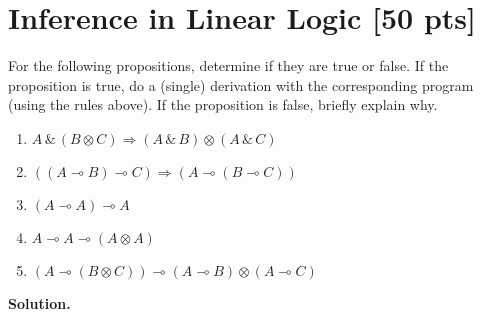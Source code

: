\documentclass{article}
\newcommand{\with}{\,\&\,}
\newcommand{\tensor}{\otimes}
\newcommand{\lolli}{\multimap}
\newenvironment{solution}{\textbf{Solution.}}{}
\begin{document}
\section{Inference in Linear Logic [50 pts]}
For the following propositions, determine if they are true or false.
If the proposition is true, do a (single) derivation with the corresponding program
(using the rules above).
If the proposition is false, briefly explain why.

\begin{enumerate}
  \item $A \with (B \tensor C) \Rightarrow (A \with B) \tensor (A \with C)$
  \item $((A \lolli B) \lolli C) \Rightarrow (A \lolli (B \lolli C))$
  \item $(A \lolli A) \lolli A$
  \item $A \lolli A \lolli (A \tensor A)$
  \item $(A \lolli (B \tensor C)) \lolli (A \lolli B) \tensor (A \lolli C)$
\end{enumerate}

\begin{solution}
  
\end{solution}
\end{document}
